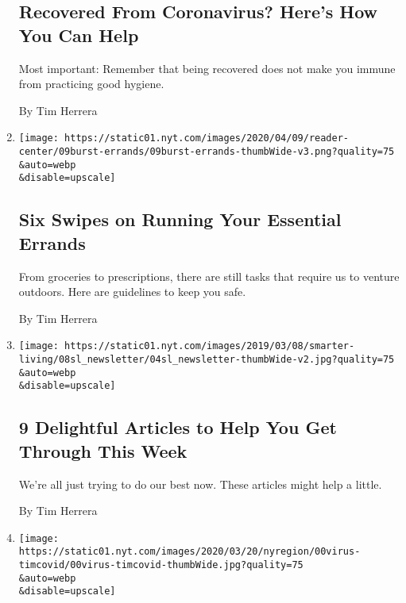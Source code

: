 \begin{enumerate}
{  \subsection{Recovered From Coronavirus? Here's How You Can
  Help}\label{recovered-from-coronavirus-heres-how-you-can-help}}

  Most important: Remember that being recovered does not make you immune
  from practicing good hygiene.

  By Tim Herrera
\item
  \href{/interactive/2020/04/10/burst/coronavirus-shopping-exercise-delivery.html}{}

  \texttt{[image: https://static01.nyt.com/images/2020/04/09/reader-center/09burst-errands/09burst-errands-thumbWide-v3.png?quality=75\\\&auto=webp\\\&disable=upscale]}

  \hypertarget{six-swipes-on-running-your-essential-errands}{%
  \subsection{Six Swipes on Running Your Essential
  Errands}\label{six-swipes-on-running-your-essential-errands}}

  From groceries to prescriptions, there are still tasks that require us
  to venture outdoors. Here are guidelines to keep you safe.

  By Tim Herrera
\item
  \href{/2020/03/23/smarter-living/9-delightful-articles-to-help-you-get-through-this-week.html}{}

  \texttt{[image: https://static01.nyt.com/images/2019/03/08/smarter-living/08sl\_newsletter/04sl\_newsletter-thumbWide-v2.jpg?quality=75\\\&auto=webp\\\&disable=upscale]}

  \hypertarget{9-delightful-articles-to-help-you-get-through-this-week}{%
  \subsection{9 Delightful Articles to Help You Get Through This
  Week}\label{9-delightful-articles-to-help-you-get-through-this-week}}

  We're all just trying to do our best now. These articles might help a
  little.

  By Tim Herrera
\item
  \href{/2020/03/18/nyregion/coronavirus-testing-positive.html}{}

  \texttt{[image: https://static01.nyt.com/images/2020/03/20/nyregion/00virus-timcovid/00virus-timcovid-thumbWide.jpg?quality=75\\\&auto=webp\\\&disable=upscale]}


\end{enumerate}
